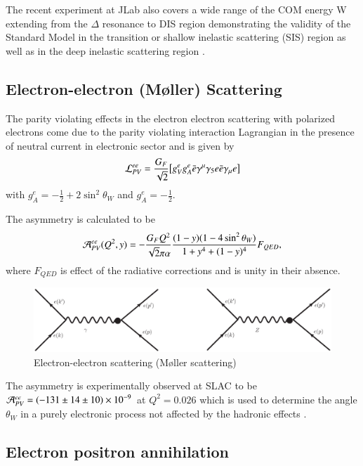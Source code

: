 The recent experiment at JLab also covers a wide range of the COM energy W extending from the $\Delta$ resonance to DIS region demonstrating the validity of the Standard Model in the transition or shallow inelastic scattering (SIS) region as well as in the deep inelastic scattering region \cite{key28}.
    
\subsection{Electron-electron (M\o ller) Scattering}\label{chap9-subsec3.4}

The parity violating effects in the electron electron scattering with polarized electrons come due to the parity violating interaction Lagrangian in the presence of neutral current in electronic sector and is given by 
\begin{equation}
{\cal L}_{PV}^{ee}= \frac{G_F}{\sqrt{2}}\big[g_V^eg_A^e  \bar{e} \gamma^\mu \gamma_5 e\bar{e}\gamma_\mu e\big] \label{chap9-eq35}
\end{equation}
 with $g_A^e =-\frac{1}{2}+2\sin^2\theta_W$ and $g_A^e=-\frac{1}{2}$.
 
The asymmetry is calculated to be
\begin{equation}
{\cal A}_{PV}^{ee}(Q^2,y)= -\frac{G_F Q^2}{\sqrt{2}\pi\alpha} \frac{(1-y)(1-4\sin^2\theta_W)}{1+y^4+(1-y)^4} F_{QED}, \label{chap9-eq36}
\end{equation}
where  $F_{QED}$ is effect of the radiative corrections and is unity in their absence. 
\begin{figure}[H]
\centering
\includegraphics[scale=0.35]{src/images/chap9/fig4.eps}
\caption{Electron-electron scattering (M\o ller scattering)}\label{chap9-fig5}
\end{figure}

The asymmetry is experimentally observed at SLAC to be ${\cal A}_{PV}^{ee}= (-131\pm14\pm10)\times{10}^{-9}$ at $Q^2=0.026$
which is used to determine the angle $\theta_W$ in a purely electronic process not affected by the hadronic effects \cite{key29}. 

\subsection{Electron positron annihilation}\label{chap9-subsec3.5}

